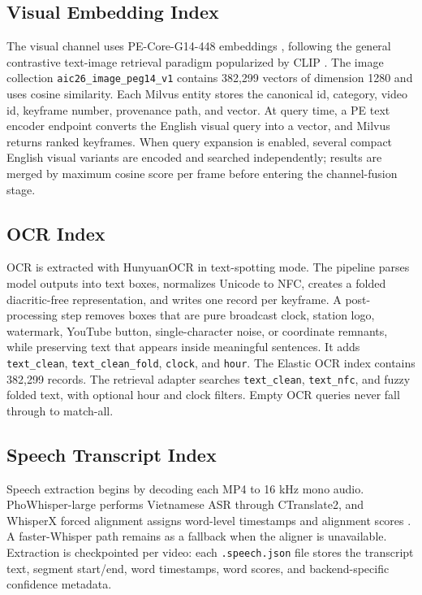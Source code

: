 \documentclass[conference]{IEEEtran}
\begin{document}
\subsection{Visual Embedding Index}

The visual channel uses PE-Core-G14-448 embeddings
\cite{bolya2025perceptionencoder}, following the general contrastive text-image
retrieval paradigm popularized by CLIP \cite{radford2021clip}. The image collection
\texttt{aic26\_image\_peg14\_v1} contains 382,299 vectors of dimension 1280 and
uses cosine similarity. Each Milvus entity stores the canonical id, category,
video id, keyframe number, provenance path, and vector. At query time, a PE text
encoder endpoint converts the English visual query into a vector, and Milvus
returns ranked keyframes. When query expansion is enabled, several compact
English visual variants are encoded and searched independently; results are
merged by maximum cosine score per frame before entering the channel-fusion
stage.

\subsection{OCR Index}

OCR is extracted with HunyuanOCR \cite{hunyuanocr2025} in text-spotting mode. The pipeline parses model
outputs into text boxes, normalizes Unicode to NFC, creates a folded
diacritic-free representation, and writes one record per keyframe. A
post-processing step removes boxes that are pure broadcast clock, station logo,
watermark, YouTube button, single-character noise, or coordinate remnants, while
preserving text that appears inside meaningful sentences. It adds
\texttt{text\_clean}, \texttt{text\_clean\_fold}, \texttt{clock}, and
\texttt{hour}. The Elastic OCR index contains 382,299 records. The retrieval
adapter searches \texttt{text\_clean}, \texttt{text\_nfc}, and fuzzy folded text,
with optional hour and clock filters. Empty OCR queries never fall through to
match-all.

\subsection{Speech Transcript Index}

Speech extraction begins by decoding each MP4 to 16 kHz mono audio.
\mbox{PhoWhisper-large} \cite{le2024phowhisper} performs Vietnamese ASR through CTranslate2, and
WhisperX forced alignment assigns word-level timestamps and alignment scores
\cite{bain2023whisperx}. A faster-Whisper path remains as a
fallback when the aligner is unavailable. Extraction is checkpointed per video:
each \texttt{.speech.json} file stores the transcript text, segment start/end,
word timestamps, word scores, and backend-specific confidence metadata.
\end{document}
